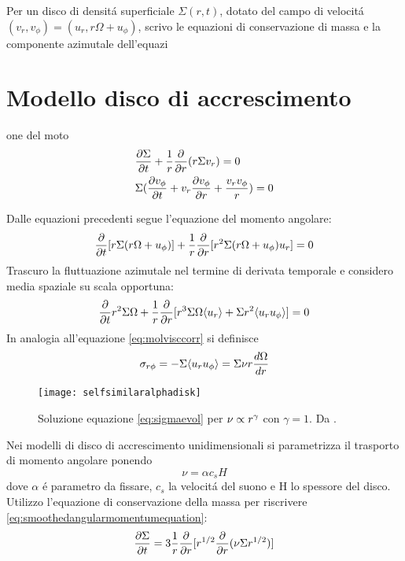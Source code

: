 Per un disco di densit\'a superficiale $\Sigma(r,t)$, dotato del campo di velocit\'a $(v_r,v_{\phi})=(u_r,r\Omega+u_{\phi})$, scrivo le equazioni di conservazione di massa e la componente azimutale dell'equazi\section{Modello disco di accrescimento}
one del moto
\begin{align}
	&\PDy{t}{\Sigma}+\frac{1}{r}\PDof{r}(r\Sigma v_r)=0\label{eq:massconservation}\\
	&\Sigma(\PDy{t}{v_{\phi}}+v_r\PDy{r}{v_{\phi}}+\frac{v_rv_{\phi}}{r})=0
\end{align}

Dalle equazioni precedenti segue l'equazione del momento angolare:
\begin{equation}
\PDof{t}[r\Sigma(r\Omega+u_{\phi})]+\frac{1}{r}\PDof{r}[r^2\Sigma(r\Omega+u_{\phi})u_r]=0
\end{equation}
Trascuro la fluttuazione azimutale nel termine di derivata temporale e considero media spaziale su scala opportuna:
\begin{equation}
\PDof{t}r^2\Sigma\Omega+\frac{1}{r}\PDof{r}[r^3\Sigma\Omega\exv{u_r}+\Sigma r^2\exv{u_ru_{\phi}}]=0\label{eq:smoothedangularmomentumequation}
\end{equation}
In analogia all'equazione \eqref{eq:molvisccorr} si definisce
\begin{equation}
\sigma_{r\phi}=-\Sigma\exv{u_ru_{\phi}}=\Sigma\nu r \TDy{r}{\Omega}
\end{equation}

\begin{wrapfigure}[17]{l}{0.5\textwidth}
	\texttt{[image: selfsimilaralphadisk]}
	\caption{Soluzione equazione \eqref{eq:sigmaevol} per $\nu\propto r\expy{\gamma}$ con $\gamma=1$. Da \cite{armitage2007lecture}.}\label{fig:selfsimilaralphadisk}
\end{wrapfigure}

Nei modelli di disco di accrescimento unidimensionali si parametrizza il trasporto di momento angolare ponendo
\begin{equation}
\nu=\alpha c_s H
\end{equation}
dove $\alpha$ \'e parametro da fissare, $c_s$ la velocit\'a del suono e H lo spessore del disco. Utilizzo l'equazione di conservazione della massa per riscrivere \eqref{eq:smoothedangularmomentumequation}:
\begin{equation}
\PDy{t}{\Sigma}=3\frac{1}{r}\PDof{r}[r\expy{1/2}\PDof{r}(\nu\Sigma r\expy{1/2})]\label{eq:sigmaevol}
\end{equation}

